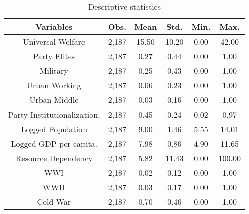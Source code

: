 \begin{table}[ht]
\centering
\caption{Descriptive statistics}
	\begin{adjustbox}{width=0.7\textwidth}
\begin{tabular}{cccccc}
  \hline
		Variables & Obs. & Mean & Std. & Min. & Max. \\ 

  \hline
		Universal Welfare & 2,187 & 15.50 & 10.20 & 0.00 & 42.00 \\
		[0.5em] 
		Party Elites & 2,187 & 0.27 & 0.44 & 0.00 & 1.00 \\ 
		[0.5em]
		Military & 2,187 & 0.25 & 0.43 & 0.00 & 1.00 \\ 
		[0.5em]
		Urban Working & 2,187 & 0.06 & 0.23 & 0.00 & 1.00 \\ 
		[0.5em]
		Urban Middle & 2,187 & 0.03 & 0.16 & 0.00 & 1.00 \\ 
		[0.5em]
		Party Institutionalization. & 2,187 & 0.45 & 0.24 & 0.02 & 0.97 \\ 
		[0.5em]
		Logged Population & 2,187 & 9.00 & 1.46 & 5.55 & 14.01 \\ 
		[0.5em]
		Logged GDP per capita. & 2,187 & 7.98 & 0.86 & 4.90 & 11.65 \\ 
		[0.5em]
		Resource Dependency & 2,187 & 5.82 & 11.43 & 0.00 & 100.00 \\ 
		[0.5em]
		WWI & 2,187 & 0.02 & 0.12 & 0.00 & 1.00 \\ 
		[0.5em]
		WWII & 2,187 & 0.03 & 0.17 & 0.00 & 1.00 \\ 
		[0.5em]
		Cold War & 2,187 & 0.70 & 0.46 & 0.00 & 1.00 \\ 
		[0.5em]
   \hline
\end{tabular}
\end{adjustbox}
\label{tab:appendesc}
\end{table}